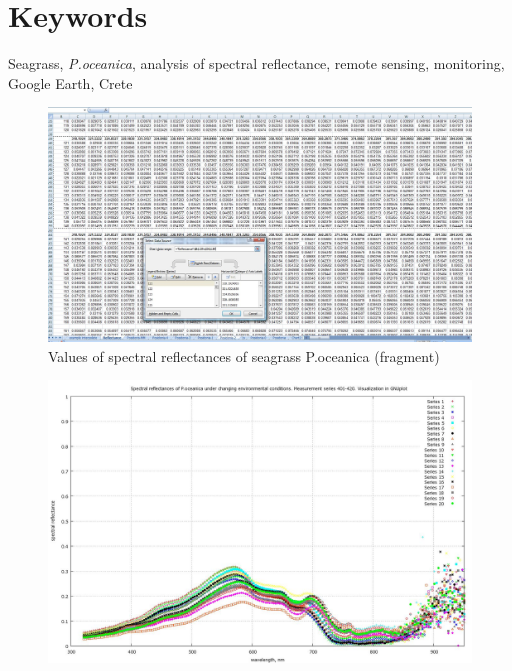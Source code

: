 \documentclass[10pt, a4paper]{article}
\begin{document}
\section{Keywords}
Seagrass, \textit{\textit{P.oceanica}}, analysis of spectral reflectance, remote sensing, monitoring, Google Earth, Crete
\pagebreak

\begin{appendices}
\appendix
\appendixpage
\addappheadtotoc
{}

\begin{figure}[h]
\begin{center}
\includegraphics[scale=0.20]{App-1.jpg}
\caption{Values of spectral reflectances of seagrass P.oceanica (fragment)}
\label{fig:42}
\end{center}
\end{figure}
\begin{figure}[h]
\begin{center}
\includegraphics[scale=0.20]{GNU-401-420.jpg}

\end{center}
\end{figure}
\end{appendices}
\end{document}
